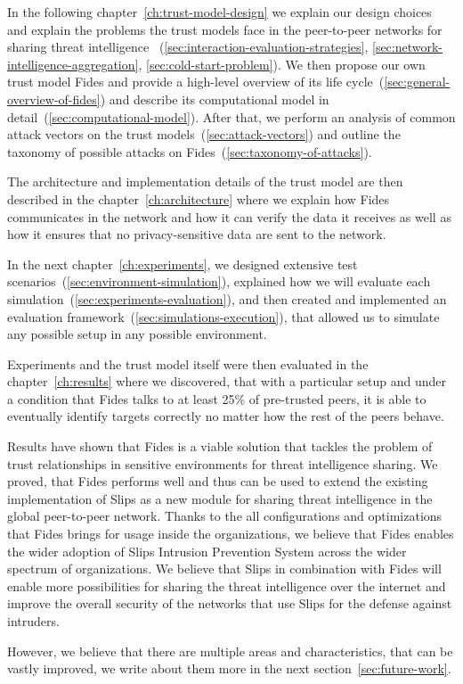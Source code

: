 In the following chapter~\ref{ch:trust-model-design} we explain our design choices and explain the problems the trust models face in the peer-to-peer networks for sharing threat intelligence ~(\ref{sec:interaction-evaluation-strategies}, \ref{sec:network-intelligence-aggregation}, \ref{sec:cold-start-problem}).
We then propose our own trust model Fides and provide a high-level overview of its life cycle~(\ref{sec:general-overview-of-fides}) and describe its computational model in detail~(\ref{sec:computational-model}).
After that, we perform an analysis of common attack vectors on the trust models~(\ref{sec:attack-vectors}) and outline the taxonomy of possible attacks on Fides~(\ref{sec:taxonomy-of-attacks}).

The architecture and implementation details of the trust model are then described in the chapter~\ref{ch:architecture} where we explain how Fides communicates in the network and how it can verify the data it receives as well as how it ensures that no privacy-sensitive data are sent to the network.

In the next chapter~\ref{ch:experiments}, we designed extensive test scenarios~(\ref{sec:environment-simulation}), explained how we will evaluate each simulation~(\ref{sec:experiments-evaluation}), and then created and implemented an evaluation framework~(\ref{sec:simulations-execution}), that allowed us to simulate any possible setup in any possible environment.

Experiments and the trust model itself were then evaluated in the chapter~\ref{ch:results} where we discovered, that with a particular setup and under a condition that Fides talks to at least 25\% of pre-trusted peers, it is able to eventually identify targets correctly no matter how the rest of the peers behave.

Results have shown that Fides is a viable solution that tackles the problem of trust relationships in sensitive environments for threat intelligence sharing. 
We proved, that Fides performs well and thus can be used to extend the existing implementation of Slips as a new module for sharing threat intelligence in the global peer-to-peer network.
Thanks to the all configurations and optimizations that Fides brings for usage inside the organizations, we believe that Fides enables the wider adoption of Slips Intrusion Prevention System across the wider spectrum of organizations.
We believe that Slips in combination with Fides will enable more possibilities for sharing the threat intelligence over the internet and improve the overall security of the networks that use Slips for the defense against intruders.

\vspace{5mm}

\noindent
However, we believe that there are multiple areas and characteristics, that can be vastly improved, we write about them more in the next section~\ref{sec:future-work}.

